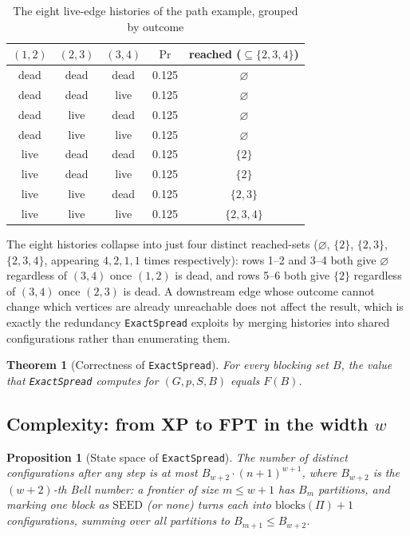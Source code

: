 \documentclass[preprint,11pt]{elsarticle}
\newtheorem{theorem}{Theorem}
\newtheorem{proposition}{Proposition}
\theoremstyle{definition}
\theoremstyle{remark}
\newcommand{\up}{\rule{0pt}{2.6ex}}
\newcommand{\down}{\rule[-1.2ex]{0pt}{0pt}}
\newcommand{\FF}{F}
\begin{document}
\begin{table}[h]
\centering
\caption{The eight live-edge histories of the path example, grouped by outcome\label{tab:twig-example}}
\begin{tabular}{@{}ccccc@{}}
\hline
\up $(1,2)$ & $(2,3)$ & $(3,4)$ & $\Pr$ & reached ($\subseteq\{2,3,4\}$) \\
\hline
\up dead & dead & dead & 0.125 & $\varnothing$ \\
dead & dead & live & 0.125 & $\varnothing$ \\
dead & live & dead & 0.125 & $\varnothing$ \\
dead & live & live & 0.125 & $\varnothing$ \\
live & dead & dead & 0.125 & $\{2\}$ \\
live & dead & live & 0.125 & $\{2\}$ \\
live & live & dead & 0.125 & $\{2,3\}$ \\
\down live & live & live & 0.125 & $\{2,3,4\}$ \\
\hline
\end{tabular}
{\footnotesize The eight histories collapse into just four distinct reached-sets
($\varnothing$, $\{2\}$, $\{2,3\}$, $\{2,3,4\}$, appearing $4,2,1,1$ times
respectively): rows 1--2 and 3--4 both give $\varnothing$ regardless of
$(3,4)$ once $(1,2)$ is dead, and rows 5--6 both give $\{2\}$ regardless of
$(3,4)$ once $(2,3)$ is dead. A downstream edge whose outcome cannot change
which vertices are already unreachable does not affect the result, which
is exactly the redundancy \texttt{ExactSpread} exploits by merging
histories into shared configurations rather than enumerating them.}
\end{table}

\begin{theorem}[Correctness of \texttt{ExactSpread}]\label{thm:twig-correct}
For every blocking set $B$, the value that \texttt{ExactSpread} computes for $(G,p,S,B)$ equals $\FF(B)$.
\end{theorem}

\subsection{Complexity: from XP to FPT in the width $w$}\label{sec:twig-complexity}

\begin{proposition}[State space of \texttt{ExactSpread}]\label{prop:xp-space}
The number of distinct configurations after any step is at most
$B_{w+2}\cdot(n+1)^{w+1}$, where $B_{w+2}$ is the $(w+2)$-th Bell number: a
frontier of size $m\le w+1$ has $B_m$ partitions, and marking one block as
$\mathrm{SEED}$ (or none) turns each into $\mathrm{blocks}(\Pi)+1$
configurations, summing over all partitions to $B_{m+1}\le B_{w+2}$.
\end{proposition}
\end{document}
